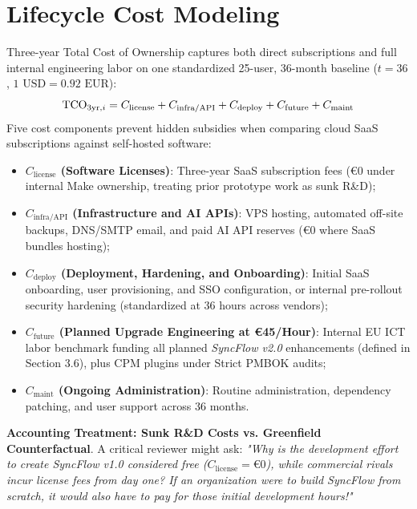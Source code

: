 \newpage

\section{Lifecycle Cost Modeling}
Three-year Total Cost of Ownership captures both direct subscriptions and full internal engineering labor on one standardized 25-user, 36-month baseline ($t = 36$, $1\text{ USD} = 0.92\text{ EUR}$):
\begin{equation*}
    \setlength{\abovedisplayskip}{3pt}
    \setlength{\belowdisplayskip}{3pt}
    \text{TCO}_{3\text{yr},i} = C_{\text{license}} + C_{\text{infra/API}} + C_{\text{deploy}} + C_{\text{future}} + C_{\text{maint}}
\end{equation*}
Five cost components prevent hidden subsidies when comparing cloud SaaS subscriptions against self-hosted software:
\begin{itemize}[itemsep=0.5pt,topsep=1pt,parsep=0pt]
    \item \textbf{$C_{\text{license}}$ (Software Licenses)}: Three-year SaaS subscription fees (€0 under internal Make ownership, treating prior prototype work as sunk R\&D);
    \item \textbf{$C_{\text{infra/API}}$ (Infrastructure and AI APIs)}: VPS hosting, automated off-site backups, DNS/SMTP email, and paid AI API reserves (€0 where SaaS bundles hosting);
    \item \textbf{$C_{\text{deploy}}$ (Deployment, Hardening, and Onboarding)}: Initial SaaS onboarding, user provisioning, and SSO configuration, or internal pre-rollout security hardening (standardized at 36 hours across vendors);
    \item \textbf{$C_{\text{future}}$ (Planned Upgrade Engineering at €45/Hour)}: Internal EU ICT labor benchmark \cite{eurostat} funding all planned \textit{SyncFlow v2.0} enhancements (defined in Section 3.6), plus CPM plugins under Strict PMBOK audits;
    \item \textbf{$C_{\text{maint}}$ (Ongoing Administration)}: Routine administration, dependency patching, and user support across 36 months.
\end{itemize}

\vspace{1mm}

\noindent \textbf{Accounting Treatment: Sunk R\&D Costs vs. Greenfield Counterfactual}. A critical reviewer might ask: \textit{"Why is the development effort to create SyncFlow v1.0 considered free ($C_{\text{license}} = \text{€}0$), while commercial rivals incur license fees from day one? If an organization were to build SyncFlow from scratch, it would also have to pay for those initial development hours!"}

